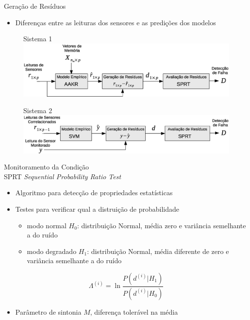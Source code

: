 \documentclass{beamer}
\begin{document}
\begin{frame}{Geração de Resíduos}

    \begin{itemize}
        \item Diferenças entre as leituras dos sensores e as predições dos modelos
    \end{itemize}
    
    \begin{figure}[!htb]
        \centering Sistema 1
        \includegraphics[width=.8\textwidth]{figuras/aakr_sprt.eps}
    \end{figure}
    
    \begin{figure}[!htb]
        \centering Sistema 2
        \includegraphics[width=.8\textwidth]{figuras/svm_sprt.eps}
    \end{figure}
\end{frame}

\begin{frame}{Monitoramento da Condição\\SPRT}
    \textit{Sequential Probability Ratio Test}
    
    \begin{itemize}
        \item Algoritmo para detecção de propriedades estatísticas
        \item Testes para verificar qual a distruição de probabilidade
            \begin{itemize}
                \item modo normal $H_0$: distribuição Normal, média zero e variância
                    semelhante a do ruído
                \item modo degradado $H_1$: distribuição Normal, média diferente de zero e
                    variância semelhante a do ruído
            \end{itemize}
    \end{itemize}
    $$
    \Lambda^{(i)} = \ln \frac{P(d^{(i)} | H_1)}{P(d^{(i)} | H_0)}
    \label{eq:loglikelihood}
    $$
    \begin{itemize}
        \item Parâmetro de sintonia $M$, diferença tolerável na média
    \end{itemize}

\end{frame}
\end{document}
